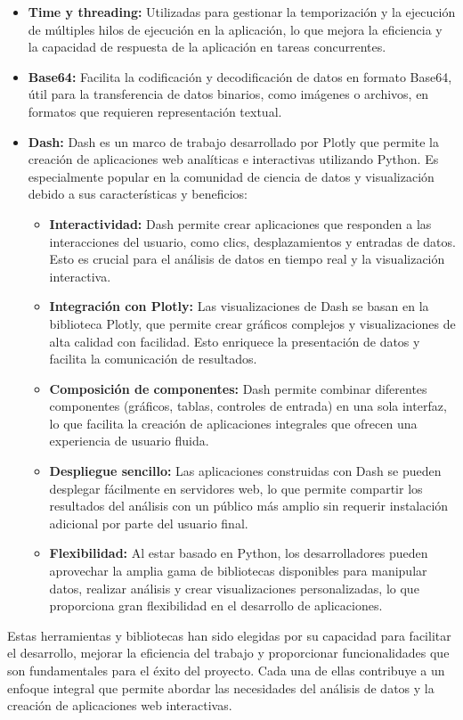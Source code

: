 \begin{itemize}
    \item \textbf{Time y threading:} Utilizadas para gestionar la temporización y la ejecución de múltiples hilos de ejecución en la aplicación, lo que mejora la eficiencia y la capacidad de respuesta de la aplicación en tareas concurrentes.
    \item \textbf{Base64:} Facilita la codificación y decodificación de datos en formato Base64, útil para la transferencia de datos binarios, como imágenes o archivos, en formatos que requieren representación textual.
    \item \textbf{Dash:} 
    Dash es un marco de trabajo desarrollado por Plotly que permite la creación de aplicaciones web analíticas e interactivas utilizando Python. Es especialmente popular en la comunidad de ciencia de datos y visualización debido a sus características y beneficios:
    \begin{itemize}
        \item \textbf{Interactividad:} Dash permite crear aplicaciones que responden a las interacciones del usuario, como clics, desplazamientos y entradas de datos. Esto es crucial para el análisis de datos en tiempo real y la visualización interactiva.
        \item \textbf{Integración con Plotly:} Las visualizaciones de Dash se basan en la biblioteca Plotly, que permite crear gráficos complejos y visualizaciones de alta calidad con facilidad. Esto enriquece la presentación de datos y facilita la comunicación de resultados.
        \item \textbf{Composición de componentes:} Dash permite combinar diferentes componentes (gráficos, tablas, controles de entrada) en una sola interfaz, lo que facilita la creación de aplicaciones integrales que ofrecen una experiencia de usuario fluida.
        \item \textbf{Despliegue sencillo:} Las aplicaciones construidas con Dash se pueden desplegar fácilmente en servidores web, lo que permite compartir los resultados del análisis con un público más amplio sin requerir instalación adicional por parte del usuario final.
        \item \textbf{Flexibilidad:} Al estar basado en Python, los desarrolladores pueden aprovechar la amplia gama de bibliotecas disponibles para manipular datos, realizar análisis y crear visualizaciones personalizadas, lo que proporciona gran flexibilidad en el desarrollo de aplicaciones.
    \end{itemize}
\end{itemize}

Estas herramientas y bibliotecas han sido elegidas por su capacidad para facilitar el desarrollo, mejorar la eficiencia del trabajo y proporcionar funcionalidades que son fundamentales para el éxito del proyecto. Cada una de ellas contribuye a un enfoque integral que permite abordar las necesidades del análisis de datos y la creación de aplicaciones web interactivas.


